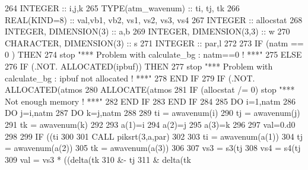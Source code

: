 \begin{DoxyCode}
264     \textcolor{keywordtype}{INTEGER} :: i,j,k
265     \textcolor{keywordtype}{TYPE}(atm\_wavenum) :: ti, tj, tk
266     \textcolor{keywordtype}{REAL(KIND=8)} :: val,vb1, vb2, vs1, vs2, vs3, vs4
267     \textcolor{keywordtype}{INTEGER} :: allocstat
268     \textcolor{keywordtype}{INTEGER}, \textcolor{keywordtype}{DIMENSION(3)} :: a,b
269     \textcolor{keywordtype}{INTEGER}, \textcolor{keywordtype}{DIMENSION(3,3)} :: w
270     \textcolor{keywordtype}{CHARACTER}, \textcolor{keywordtype}{DIMENSION(3)} :: s
271     \textcolor{keywordtype}{INTEGER} :: par,l
272 
273     \textcolor{keywordflow}{IF} (natm == 0 ) \textcolor{keywordflow}{THEN}
274        stop \textcolor{stringliteral}{"*** Problem with calculate\_bg : natm==0 ! ***"}
275     \textcolor{keywordflow}{ELSE}
276        \textcolor{keywordflow}{IF} (.NOT. \textcolor{keyword}{ALLOCATED}(ipbuf)) \textcolor{keywordflow}{THEN}
277           stop \textcolor{stringliteral}{"*** Problem with calculate\_bg : ipbuf not allocated ! ***"}
278 \textcolor{keywordflow}{       END IF}
279        \textcolor{keywordflow}{IF} (.NOT. \textcolor{keyword}{ALLOCATED}(atmos%
280           \textcolor{keyword}{ALLOCATE}(atmos%
281           \textcolor{keywordflow}{IF} (allocstat /= 0) stop \textcolor{stringliteral}{"*** Not enough memory ! ***"}
282 \textcolor{keywordflow}{       END IF}
283 \textcolor{keywordflow}{    END IF}
284 
285     \textcolor{keywordflow}{DO} i=1,natm
286        \textcolor{keywordflow}{DO} j=i,natm
287           \textcolor{keywordflow}{DO} k=j,natm
288 
289              ti = awavenum(i)
290              tj = awavenum(j)
291              tk = awavenum(k)
292 
293              a(1)=i
294              a(2)=j
295              a(3)=k
296 
297              val=0.d0
298 
299              \textcolor{keywordflow}{IF} ((ti%
300 
301                 \textcolor{keyword}{CALL }piksrt(3,a,par)
302 
303                 ti = awavenum(a(1))
304                 tj = awavenum(a(2))
305                 tk = awavenum(a(3))
306 
307                 vs3 = s3(tj%
308                 vs4 = s4(tj%
309                 val = vs3 * ((delta(tk%
310                      &- tj%
311                      & delta(tk%

\end{DoxyCode}

